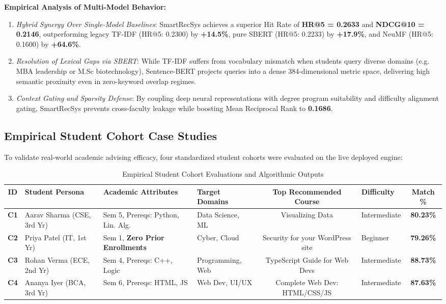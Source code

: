 \documentclass[conference,letterpaper]{IEEEtran}
\begin{document}
\textbf{Empirical Analysis of Multi-Model Behavior:}
\begin{enumerate}
    \item \textit{Hybrid Synergy Over Single-Model Baselines}: SmartRecSys achieves a superior Hit Rate of \textbf{HR@5 = 0.2633} and \textbf{NDCG@10 = 0.2146}, outperforming legacy TF-IDF (HR@5: 0.2300) by \textbf{+14.5\%}, pure SBERT (HR@5: 0.2233) by \textbf{+17.9\%}, and NeuMF (HR@5: 0.1600) by \textbf{+64.6\%}.
    \item \textit{Resolution of Lexical Gaps via SBERT}: While TF-IDF suffers from vocabulary mismatch when students query diverse domains (e.g. MBA leadership or M.Sc biotechnology), Sentence-BERT projects queries into a dense 384-dimensional metric space, delivering high semantic proximity even in zero-keyword overlap regimes.
    \item \textit{Context Gating and Sparsity Defense}: By coupling deep neural representations with degree program suitability and difficulty alignment gating, SmartRecSys prevents cross-faculty leakage while boosting Mean Reciprocal Rank to \textbf{0.1686}.
\end{enumerate}

\subsection{Empirical Student Cohort Case Studies}
To validate real-world academic advising efficacy, four standardized student cohorts were evaluated on the live deployed engine:

\begin{table}[htbp]
\caption{Empirical Student Cohort Evaluations and Algorithmic Outputs}
\label{tab:cohorts_expanded}
\centering
\begin{threeparttable}
\begin{tabular}{clllclc}
\toprule
\textbf{ID} & \textbf{Student Persona} & \textbf{Academic Attributes} & \textbf{Target Domains} & \textbf{Top Recommended Course} & \textbf{Difficulty} & \textbf{Match \%} \\
\midrule
\textbf{C1} & Aarav Sharma (CSE, 3rd Yr) & Sem 5, Prereqs: Python, Lin. Alg. & Data Science, ML & Visualizing Data & Intermediate & \textbf{80.23\%} \\
\textbf{C2} & Priya Patel (IT, 1st Yr) & Sem 1, \textbf{Zero Prior Enrollments} & Cyber, Cloud & Security for your WordPress site & Beginner & \textbf{79.26\%} \\
\textbf{C3} & Rohan Verma (ECE, 2nd Yr) & Sem 4, Prereqs: C++, Logic & Programming, Web & TypeScript Guide for Web Devs & Intermediate & \textbf{88.73\%} \\
\textbf{C4} & Ananya Iyer (BCA, 3rd Yr) & Sem 6, Prereqs: HTML, JS & Web Dev, UI/UX & Complete Web Dev: HTML/CSS/JS & Intermediate & \textbf{87.63\%} \\
\bottomrule
\end{tabular}
\end{threeparttable}
\end{table}
\end{document}
